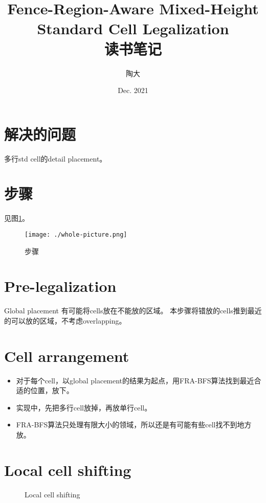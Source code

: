 \documentclass[UTF8,a4paper]{ctexart}
\title{Fence-Region-Aware Mixed-Height Standard Cell Legalization\\
    读书笔记}
\author{陶大}
\date{Dec. 2021}
\begin{document}
\maketitle
\tableofcontents

\section{解决的问题}

多行std cell的detail placement。

\section{步骤}

见图\ref{steps}。

\begin{figure}
    \begin{center}
        \texttt{[image: ./whole-picture.png]}
    \end{center}
    \caption{步骤}        
    \label{steps}
\end{figure}

\section{Pre-legalization}

Global placement 有可能将cells放在不能放的区域。
本步骤将错放的cells推到最近的可以放的区域，不考虑overlapping。

\section{Cell arrangement}

\begin{itemize}
\item 对于每个cell，以global placement的结果为起点，用FRA-BFS算法找到最近合适的位置，放下。
\item 实现中，先把多行cell放掉，再放单行cell。
\item FRA-BFS算法只处理有限大小的领域，所以还是有可能有些cell找不到地方放。
\end{itemize}

\section{Local cell shifting}

\begin{figure}
    \begin{center}
        \qquad
    \end{center}
    \caption{Local cell shifting}
    \label{local-cell-shifting}
\end{figure}
\end{document}
